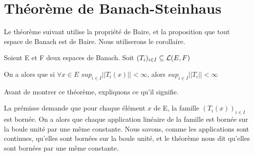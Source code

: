 \chapter{Théorème de Banach-Steinhaus}

Le théorème suivant utilise la propriété de Baire, et la proposition que tout
espace de Banach est de Baire. Nous utiliserons le corollaire.

\begin{theorem} 
	Soient E et F deux espaces de Banach.
	Soit $(T_{i})_{i \in I} \subseteq \mathcal{L}(E, F)$
	\label{banach-steinhaus}

	On a alors que si $\forall x \in E$ $sup_{i \in I}||T_{i}(x)|| < \infty$,
	alors $sup_{i \in I} ||T_{i}|| < \infty$
\end{theorem}

Avant de montrer ce théorème, expliquons ce qu'il signifie.

La prémisse demande que pour chaque élément $x$ de E, la famille $(T_{i}(x))_{i
\in I}$ est bornée.
On a alors que chaque application linéaire de la famille est bornée sur la
boule unité par une même constante. Nous savons, comme les applications sont
continues, qu'elles sont bornées sur la boule unité, et le théorème nous dit
qu'elles sont bornées par une même constante.

